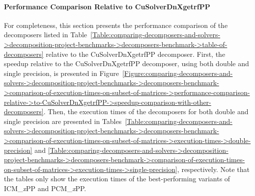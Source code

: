 \paragraph{Performance Comparison Relative to CuSolverDnXgetrfPP}\label{Paragraph:comparing-decomposers-and-solvers->decomposition-project-benchmarks->decomposers-benchmark->comparison-of-execution-times-on-subset-of-matrices->performance-comparison-relative->to-CuSolverDnXgetrfPP} For completeness, this section presents the performance comparison of the decomposers listed in Table~\ref{Table:comparing-decomposers-and-solvers->decomposition-project-benchmarks->decomposers-benchmark->table-of-decomposers} relative to the CuSolverDnXgetrfPP decomposer.
First, the speedup relative to the CuSolverDnXgetrfPP decomposer, using both double and single precision, is presented in Figure~\ref{Figure:comparing-decomposers-and-solvers->decomposition-project-benchmarks->decomposers-benchmark->comparison-of-execution-times-on-subset-of-matrices->performance-comparison-relative->to-CuSolverDnXgetrfPP->speedup-comparison-with-other-decomposers}.
Then, the execution times of the decomposers for both double and single precision are presented in Tables~\ref{Table:comparing-decomposers-and-solvers->decomposition-project-benchmarks->decomposers-benchmark->comparison-of-execution-times-on-subset-of-matrices->execution-times->double-precision} and \ref{Table:comparing-decomposers-and-solvers->decomposition-project-benchmarks->decomposers-benchmark->comparison-of-execution-times-on-subset-of-matrices->execution-times->single-precision}, respectively.
Note that the tables only show the execution times of the best-performing variants of ICM\_\textit{x}PP and PCM\_\textit{x}PP.

